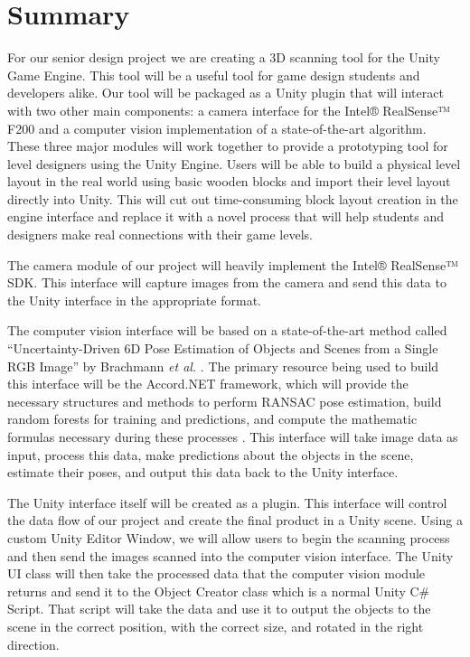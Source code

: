 \documentclass[12pt]{article}
\begin{document}
\section{Summary}\label{summary}

For our senior design project we are creating a 3D scanning tool for the
Unity Game Engine. This tool will be a useful tool for game design
students and developers alike. Our tool will be packaged as a Unity
plugin that will interact with two other main components: a camera
interface for the Intel® RealSense™ F200 and a computer vision
implementation of a state-of-the-art algorithm. These three major
modules will work together to provide a prototyping tool for level
designers using the Unity Engine. Users will be able to build a physical
level layout in the real world using basic wooden blocks and import
their level layout directly into Unity. This will cut out time-consuming
block layout creation in the engine interface and replace it with a
novel process that will help students and designers make real
connections with their game levels.

The camera module of our project will heavily implement the Intel®
RealSense™ SDK. This interface will capture images from the camera and
send this data to the Unity interface in the appropriate format.

The computer vision interface will be based on a state-of-the-art method
called ``Uncertainty-Driven 6D Pose Estimation of Objects and Scenes
from a Single RGB Image'' by Brachmann \emph{et al.}
\autocite{brachmann}. The primary resource being used to build this
interface will be the Accord.NET framework, which will provide the
necessary structures and methods to perform RANSAC pose estimation,
build random forests for training and predictions, and compute the
mathematic formulas necessary during these processes \autocite{accord}.
This interface will take image data as input, process this data, make
predictions about the objects in the scene, estimate their poses, and
output this data back to the Unity interface.

The Unity interface itself will be created as a plugin. This interface
will control the data flow of our project and create the final product
in a Unity scene. Using a custom Unity Editor Window, we will allow
users to begin the scanning process and then send the images scanned
into the computer vision interface. The Unity UI class will then take
the processed data that the computer vision module returns and send it
to the Object Creator class which is a normal Unity C\# Script. That
script will take the data and use it to output the objects to the scene
in the correct position, with the correct size, and rotated in the right
direction.
\end{document}
